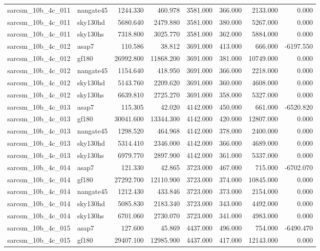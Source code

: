 \begin{tabular}{llrrrrrr}
sarcsm\_10b\_4c\_011 & nangate45 & 1244.330 & 460.978 & 3581.000 & 366.000 & 2133.000 & 0.000 \\
sarcsm\_10b\_4c\_011 & sky130hd & 5680.640 & 2479.880 & 3581.000 & 380.000 & 5267.000 & 0.000 \\
sarcsm\_10b\_4c\_011 & sky130hs & 7318.800 & 3025.770 & 3581.000 & 362.000 & 5884.000 & 0.000 \\
sarcsm\_10b\_4c\_012 & asap7 & 110.586 & 38.812 & 3691.000 & 413.000 & 666.000 & -6197.550 \\
sarcsm\_10b\_4c\_012 & gf180 & 26992.800 & 11868.200 & 3691.000 & 381.000 & 10749.000 & 0.000 \\
sarcsm\_10b\_4c\_012 & nangate45 & 1154.640 & 418.950 & 3691.000 & 366.000 & 2218.000 & 0.000 \\
sarcsm\_10b\_4c\_012 & sky130hd & 5143.760 & 2209.620 & 3691.000 & 360.000 & 4608.000 & 0.000 \\
sarcsm\_10b\_4c\_012 & sky130hs & 6639.810 & 2725.270 & 3691.000 & 358.000 & 5327.000 & 0.000 \\
sarcsm\_10b\_4c\_013 & asap7 & 115.305 & 42.020 & 4142.000 & 450.000 & 661.000 & -6520.820 \\
sarcsm\_10b\_4c\_013 & gf180 & 30041.600 & 13344.300 & 4142.000 & 420.000 & 12807.000 & 0.000 \\
sarcsm\_10b\_4c\_013 & nangate45 & 1298.520 & 464.968 & 4142.000 & 378.000 & 2400.000 & 0.000 \\
sarcsm\_10b\_4c\_013 & sky130hd & 5314.410 & 2346.000 & 4142.000 & 366.000 & 4689.000 & 0.000 \\
sarcsm\_10b\_4c\_013 & sky130hs & 6979.770 & 2897.900 & 4142.000 & 361.000 & 5337.000 & 0.000 \\
sarcsm\_10b\_4c\_014 & asap7 & 121.330 & 42.865 & 3723.000 & 467.000 & 715.000 & -6702.070 \\
sarcsm\_10b\_4c\_014 & gf180 & 27292.700 & 12110.900 & 3723.000 & 374.000 & 10845.000 & 0.000 \\
sarcsm\_10b\_4c\_014 & nangate45 & 1212.430 & 433.846 & 3723.000 & 373.000 & 2154.000 & 0.000 \\
sarcsm\_10b\_4c\_014 & sky130hd & 5085.830 & 2183.340 & 3723.000 & 343.000 & 4492.000 & 0.000 \\
sarcsm\_10b\_4c\_014 & sky130hs & 6701.060 & 2730.070 & 3723.000 & 341.000 & 4983.000 & 0.000 \\
sarcsm\_10b\_4c\_015 & asap7 & 127.600 & 45.869 & 4437.000 & 496.000 & 754.000 & -6490.470 \\
sarcsm\_10b\_4c\_015 & gf180 & 29407.100 & 12985.900 & 4437.000 & 417.000 & 12143.000 & 0.000 \\

\end{tabular}
